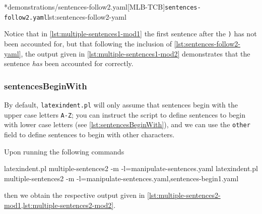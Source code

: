 	\begin{minipage}{.55\linewidth}
	\end{minipage}
	\hfill
	\begin{minipage}{.45\linewidth}
		\cmhlistingsfromfile[style=yaml-LST]*{demonstrations/sentences-follow2.yaml}[MLB-TCB]{\texttt{sentences-follow2.yaml}}{lst:sentences-follow2-yaml}
	\end{minipage}

	Notice that in \cref{lst:multiple-sentences1-mod1} the first sentence after the \texttt{)} has not been accounted for, but that
	following the inclusion of \cref{lst:sentences-follow2-yaml}, the output given in \cref{lst:multiple-sentences1-mod2} demonstrates that
	the sentence \emph{has} been accounted for correctly.

\subsubsection{sentencesBeginWith}
	By default, \texttt{latexindent.pl} will only assume that sentences begin with the upper case letters \texttt{A-Z}; you can instruct the
	script to define sentences to begin with lower case letters (see \cref{lst:sentencesBeginWith}), and we can use the \texttt{other} field
	to define sentences to begin with other characters.


	Upon running the following commands
	\begin{widepage}
		\begin{commandshell}
latexindent.pl multiple-sentences2 -m -l=manipulate-sentences.yaml
latexindent.pl multiple-sentences2 -m -l=manipulate-sentences.yaml,sentences-begin1.yaml
	\end{commandshell}
	\end{widepage}
	then we obtain the respective output given in \cref{lst:multiple-sentences2-mod1,lst:multiple-sentences2-mod2}.

